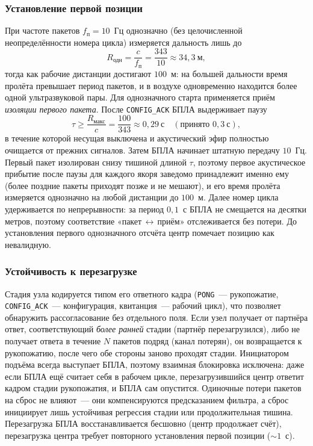 \documentclass[a4paper,11pt]{article} %
\begin{document}
\subsubsection{Установление первой позиции}

При частоте пакетов $f_\text{п}{=}10$~Гц однозначно (без целочисленной
неопределённости номера цикла) измеряется дальность лишь до
\[
R_\text{одн}=\frac{c}{f_\text{п}}=\frac{343}{10}\approx 34{,}3~\text{м},
\]
тогда как рабочие дистанции достигают $100$~м: на большей дальности время пролёта
превышает период пакетов, и в воздухе одновременно находится более одной
ультразвуковой пары. Для однозначного старта применяется приём \emph{изоляции
первого пакета}. После \texttt{CONFIG\_ACK} БПЛА выдерживает паузу
\[
\tau \ge \frac{R_\text{макс}}{c}=\frac{100}{343}\approx 0{,}29~\text{с}\quad
(\text{принято }0{,}3~\text{с}),
\]
в течение которой несущая выключена и акустический эфир полностью очищается от
прежних сигналов. Затем БПЛА начинает штатную передачу $10$~Гц. Первый пакет
изолирован снизу тишиной длиной $\tau$, поэтому первое акустическое прибытие после
паузы для каждого якоря заведомо принадлежит именно ему (более поздние пакеты
приходят позже и не мешают), и его время пролёта измеряется однозначно на любой
дистанции до $100$~м. Далее номер цикла удерживается по непрерывности: за период
$0{,}1$~с БПЛА не смещается на десятки метров, поэтому соответствие
«пакет\,$\leftrightarrow$\,приём» отслеживается без потери. До установления первого
однозначного отсчёта центр помечает позицию как невалидную.

\subsubsection{Устойчивость к перезагрузке}

Стадия узла кодируется типом его ответного кадра (\texttt{PONG}~--- рукопожатие,
\texttt{CONFIG\_ACK}~--- конфигурация, квитанция~--- рабочий цикл), что позволяет
обнаружить рассогласование без отдельного поля. Если узел получает от партнёра
ответ, соответствующий \emph{более ранней} стадии (партнёр перезагрузился), либо
не получает ответа в течение $N$ пакетов подряд (канал потерян), он возвращается к
рукопожатию, после чего обе стороны заново проходят стадии. Инициатором подъёма
всегда выступает БПЛА, поэтому взаимная блокировка исключена: даже если БПЛА ещё
считает себя в рабочем цикле, перезагрузившийся центр ответит кадром стадии
рукопожатия, и БПЛА сам опустится. Одиночные потери пакетов на сброс не влияют~---
они компенсируются предсказанием фильтра, а сброс инициирует лишь устойчивая
регрессия стадии или продолжительная тишина. Перезагрузка БПЛА восстанавливается
бесшовно (центр продолжает счёт), перезагрузка центра требует повторного
установления первой позиции (${\sim}1$~с).
\end{document}
